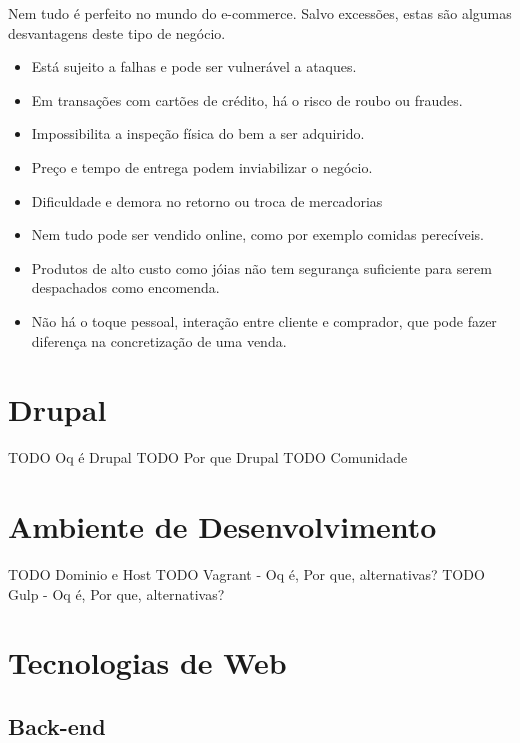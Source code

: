 Nem tudo é perfeito no mundo do e-commerce. Salvo excessões, estas são algumas desvantagens deste tipo de negócio.

\begin{itemize}
  \item Está sujeito a falhas e pode ser vulnerável a ataques.
  \item Em transações com cartões de crédito, há o risco de roubo ou fraudes.
  \item Impossibilita a inspeção física do bem a ser adquirido.
  \item Preço e tempo de entrega podem inviabilizar o negócio.
  \item Dificuldade e demora no retorno ou troca de mercadorias
  \item Nem tudo pode ser vendido online, como por exemplo comidas perecíveis.
  \item Produtos de alto custo como jóias não tem segurança suficiente para serem despachados como encomenda.
  \item Não há o toque pessoal, interação entre cliente e comprador, que pode fazer diferença na concretização de uma venda.
\end{itemize}

\section{Drupal}

TODO Oq é Drupal
TODO Por que Drupal
TODO Comunidade

\section{Ambiente de Desenvolvimento}

TODO Dominio e Host
TODO Vagrant - Oq é, Por que, alternativas?
TODO Gulp - Oq é, Por que, alternativas?

\section{Tecnologias de Web}

\subsection{Back-end}

